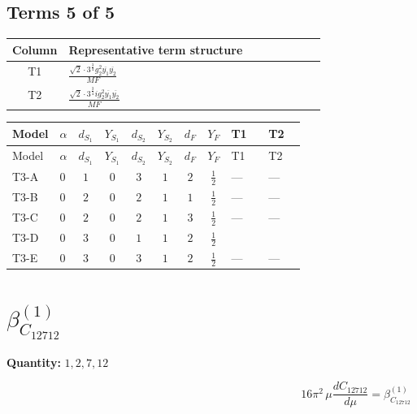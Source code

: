 \documentclass[8pt]{article}
\begin{document}
\begin{landscape}
\subsection*{Terms 5 of 5}
\begin{center}
\begin{tabular}{@{}c >{\raggedright\arraybackslash}p{0.82\linewidth}@{}}
\toprule
Column & Representative term structure \\
\midrule
T1 & \(\displaystyle \frac{\sqrt{2} \cdot 3^{\frac{3}{4}} g_{2}^{2} \overline{y_{1}} \overline{y_{2}}}{MF}\) \\
\midrule
T2 & \(\displaystyle \frac{\sqrt{2} \cdot 3^{\frac{3}{4}} i g_{2}^{2} \overline{y_{1}} \overline{y_{2}}}{MF}\) \\
\midrule
\bottomrule
\end{tabular}
\end{center}
\smallskip
\tiny
\begin{longtable}{@{}llcccccc >{\raggedright\arraybackslash}p{0.21\linewidth} >{\raggedright\arraybackslash}p{0.21\linewidth}@{}}
\toprule
Model & $\alpha$ & $d_{S_1}$ & $Y_{S_1}$ & $d_{S_2}$ & $Y_{S_2}$ & $d_F$ & $Y_F$ & T1 & T2 \\
\midrule
\endfirsthead
\toprule
Model & $\alpha$ & $d_{S_1}$ & $Y_{S_1}$ & $d_{S_2}$ & $Y_{S_2}$ & $d_F$ & $Y_F$ & T1 & T2 \\
\midrule
\endhead
T3-A & $0$ & $1$ & $0$ & $3$ & $1$ & $2$ & $\frac{1}{2}$ & --- & --- \\
\midrule
T3-B & $0$ & $2$ & $0$ & $2$ & $1$ & $1$ & $\frac{1}{2}$ & --- & --- \\
\midrule
T3-C & $0$ & $2$ & $0$ & $2$ & $1$ & $3$ & $\frac{1}{2}$ & --- & --- \\
\midrule
T3-D & $0$ & $3$ & $0$ & $1$ & $1$ & $2$ & $\frac{1}{2}$ & \scriptsize\adjustbox{max width=\linewidth}{$\begin{gathered} \frac{\sqrt{2} \cdot 3^{\frac{3}{4}} g_{2}^{2} \overline{y_{1}} \overline{y_{2}}}{6 MF}\end{gathered}$} & \scriptsize\adjustbox{max width=\linewidth}{$\begin{gathered} \frac{\sqrt{2} \cdot 3^{\frac{3}{4}} i g_{2}^{2} \overline{y_{1}} \overline{y_{2}}}{6 MF}\end{gathered}$} \\
\midrule
T3-E & $0$ & $3$ & $0$ & $3$ & $1$ & $2$ & $\frac{1}{2}$ & --- & --- \\
\midrule
\bottomrule
\end{longtable}
\clearpage
\section*{$\beta_{C_{12712}}^{(1)}$}
\noindent\textbf{Quantity: }$\mathrm{1,2,7,12}$\par\smallskip
\[16\pi^2\,\mu\frac{d C_{12712}}{d\mu}=\beta_{C_{12712}}^{(1)}\]

\end{landscape}
\end{document}
